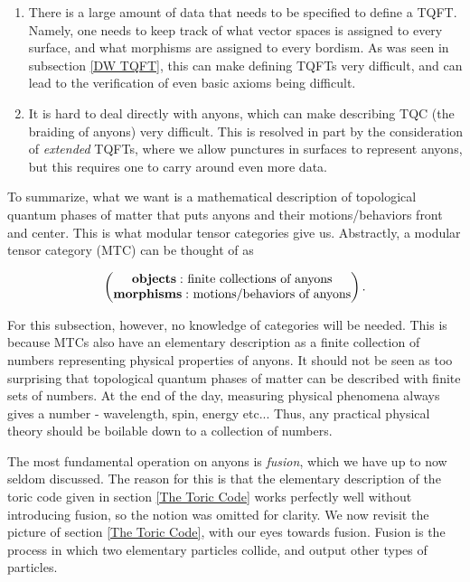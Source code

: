 \documentclass{article}
\theoremstyle{definition}
\numberwithin{figure}{section}
\begin{document}
\begin{enumerate}
\item There is a large amount of data that needs to be specified to define a TQFT. Namely, one needs to keep track of what vector spaces is assigned to every surface, and what morphisms are assigned to every bordism. As was seen in subsection \ref{DW TQFT}, this can make defining TQFTs very difficult, and can lead to the verification of even basic axioms being difficult.

\item It is hard to deal directly with anyons, which can make describing TQC (the braiding of anyons) very difficult. This is resolved in part by the consideration of \textit{extended} TQFTs, where we allow punctures in surfaces to represent anyons, but this requires one to carry around even more data.
\end{enumerate}

To summarize, what we want is a mathematical description of topological quantum phases of matter that puts anyons and their motions/behaviors front and center. This is what modular tensor categories give us. Abstractly, a modular tensor category (MTC) can be thought of as

$$
\begin{pmatrix}
\bold{objects:}\text{ finite collections of anyons} \\
\bold{morphisms:}\text{ motions/behaviors of anyons}
\end{pmatrix}.
$$

For this subsection, however, no knowledge of categories will be needed. This is because MTCs also have an elementary description as a finite collection of numbers representing physical properties of anyons. It should not be seen as too surprising that topological quantum phases of matter can be described with finite sets of numbers. At the end of the day, measuring physical phenomena always gives a number - wavelength, spin, energy etc... Thus, any practical physical theory should be boilable down to a collection of numbers.

The most fundamental operation on anyons is \textit{fusion}, which we have up to now seldom discussed. The reason for this is that the elementary description of the toric code given in section \ref{The Toric Code} works perfectly well without introducing fusion, so the notion was omitted for clarity. We now revisit the picture of section \ref{The Toric Code}, with our eyes towards fusion. Fusion is the process in which two elementary particles collide, and output other types of particles. 
\end{document}
